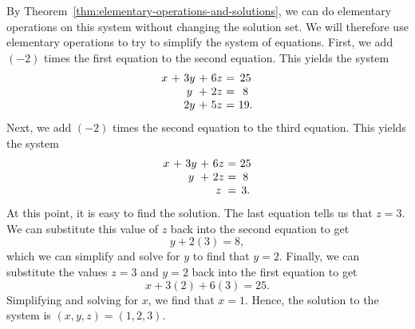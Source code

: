 \begin{solution}
  By Theorem~\ref{thm:elementary-operations-and-solutions}, we can do
  elementary operations on this system without changing the solution
  set. We will therefore use elementary operations to try to simplify
  the system of equations.  First, we add $(-2)$ times the
  first equation to the second equation. This yields the system
  \begin{equation*}
    \begin{array}{c@{~}c@{~}c@{~}c@{~}c@{~}c@{~}c}
      x&+&3y&+&6z&=&25 \\
       &&y&+&2z&=&8 \\
       &&2y&+&5z&=&19.
    \end{array}
    \label{solving-a-system2}
  \end{equation*}
  Next, we add $(-2)$ times the second equation to the
  third equation. This yields the system
  \begin{equation}\label{solving-a-system3}
    \begin{array}{c@{~}c@{~}c@{~}c@{~}c@{~}c@{~}c}
      x&+&3y&+&6z&=&25 \\
      &&y&+&2z&=&8 \\
      &&&&z&=&3.
    \end{array}
  \end{equation}
  At this point, it is easy to find the solution. The last equation
  tells us that $z=3$. We can substitute this value of $z$ back into
  the second equation to get
  \begin{equation*}
    y+2(3)=8,
  \end{equation*}
  which we can simplify and solve for $y$ to find that $y=2$. Finally,
  we can substitute the values $z=3$ and $y=2$ back into the first
  equation to get
  \begin{equation*}
    x+3(2)+6(3)=25.
  \end{equation*}
  Simplifying and solving for $x$, we find that $x=1$. Hence, the
  solution to the system is $(x,y,z)=(1,2,3)$.


\end{solution}
